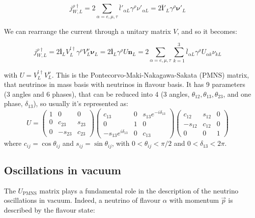 \begin{equation}
    j^{\rho\dag}_{W,L} = 2 \sum_{\alpha = e, \mu, \tau} \overline{l}'_{\alpha L} \gamma^\rho \nu'_{\alpha L} = 2 \overline{\bm{l}}'_L \gamma^\rho \bm{\nu}'_L
\end{equation}

We can rearrange the current through a unitary matrix $V$, and so it becomes: 

\begin{equation}
\label{c_current_pmns}
     j^{\rho\dag}_{W,L} = 2 \overline{\bm{l}}_LV^{l\dag}_L \gamma^\rho V^{\nu}_L \bm{\nu}_L =  2 \overline{\bm{l}}_L \gamma^\rho U \bm{n}_L = 2 \sum_{\alpha = e, \mu, \tau} \sum_{k=1}^3\overline{l}_{\alpha L}\gamma^\rho U_{\alpha k} \nu_{kL}
\end{equation}

with $U = V^{l\dag}_L V^\nu_L$. 
This is the Pontecorvo-Maki-Nakagawa-Sakata (PMNS) matrix, that  neutrinos in mass basis with neutrinos in flavour basis. 
It has 9 parameters (3 angles and 6 phases), that can be reduced into 4 (3 angles, $\theta_{12}, \theta_{13}, \theta_{23}$, and one phase, $\delta_{13}$), so usually it's represented as: 
  \[ U = 
  \begin{pmatrix}
         1 & 0 & 0 \\
         0 & c_{23} & s_{23}\\ 
         0 & -s_{23} & c_{23} 
     \end{pmatrix}
     \begin{pmatrix}
         c_{13} & 0 & s_{13}e^{-i\delta_{13}}\\
         0 & 1 & 0\\
         -s_{13}e^{i\delta_{13}} & 0 & c_{13} 
     \end{pmatrix}
     \begin{pmatrix}
         c_{12} & s_{12} & 0\\
         -s_{12} & c_{12} & 0\\ 
         0 & 0  & 1 
     \end{pmatrix} \] 
where $c_{ij} = \cos{\theta_{ij}}$ and $s_{ij} = \sin{\theta_{ij}}$, with $0 < \theta_{ij} < \pi/2$ and $0 < \delta_{13} < 2\pi$.

\subsection{Oscillations in vacuum}
\label{vacuum-oscillation}
The $U_{\text{PMNS}}$ matrix plays a fundamental role in the description of the neutrino oscillations in vacuum. Indeed, a neutrino of flavour $\alpha$ with momentum $\Vec{p}$ is described by the flavour state: 

